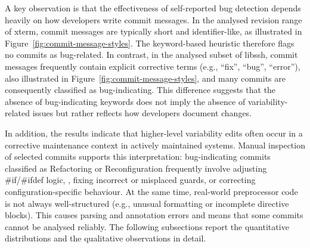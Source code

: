 A key observation is that the effectiveness of self-reported bug detection depends heavily on how developers write commit messages. In the analysed revision range of xterm, commit messages are typically short and identifier-like, as illustrated in Figure~\ref{fig:commit-message-styles}. The keyword-based heuristic therefore flags no commits as bug-related. In contrast, in the analysed subset of libssh, commit messages frequently contain explicit corrective terms (e.g., ``fix'', ``bug'', ``error''), also illustrated in Figure~\ref{fig:commit-message-styles}, and many commits are consequently classified as bug-indicating. This difference suggests that the absence of bug-indicating keywords does not imply the absence of variability-related issues but rather reflects how developers document changes.

In addition, the results indicate that higher-level variability edits often occur in a corrective maintenance context in actively maintained systems. Manual inspection of selected commits supports this interpretation: bug-indicating commits classified as Refactoring or Reconfiguration frequently involve adjusting \#if/\#ifdef logic, , fixing incorrect or misplaced guards, or correcting configuration-specific behaviour. At the same time, real-world preprocessor code is not always well-structured (e.g., unusual formatting or incomplete directive blocks). This causes parsing and annotation errors and means that some commits cannot be analysed reliably. The following subsections report the quantitative distributions and the qualitative observations in detail.


